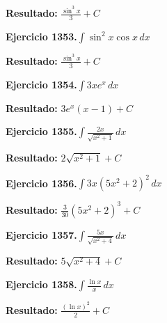 \documentclass[10pt,a4paper]{article}
\begin{document}
\begin{solbox}
\textbf{Resultado:} \(\displaystyle \frac{\sin^{3}x}{3} + C\)
\end{solbox}

\begin{ejbox}
\textbf{Ejercicio 1353.}\quad $\int \sin^{2}x \cos x\,dx$
\end{ejbox}

\begin{solbox}
\textbf{Resultado:} \(\displaystyle \frac{\sin^{3}x}{3} + C\)
\end{solbox}

\newpage
\begin{ejbox}
\textbf{Ejercicio 1354.}\quad $\int 3x e^{x}\,dx$
\end{ejbox}

\begin{solbox}
\textbf{Resultado:} \(\displaystyle 3e^x(x-1) + C\)
\end{solbox}

\begin{ejbox}
\textbf{Ejercicio 1355.}\quad $\int \frac{2x}{\sqrt{x^2+1}}\,dx$
\end{ejbox}

\begin{solbox}
\textbf{Resultado:} \(\displaystyle 2\sqrt{x^2+1} + C\)
\end{solbox}

\begin{ejbox}
\textbf{Ejercicio 1356.}\quad $\int 3x(5x^2 + 2)^{2}\,dx$
\end{ejbox}

\begin{solbox}
\textbf{Resultado:} \(\displaystyle \frac{3}{30}(5x^2+2)^{3} + C\)
\end{solbox}

\newpage
\begin{ejbox}
\textbf{Ejercicio 1357.}\quad $\int \frac{5x}{\sqrt{x^2+4}}\,dx$
\end{ejbox}

\begin{solbox}
\textbf{Resultado:} \(\displaystyle 5\sqrt{x^2+4} + C\)
\end{solbox}

\begin{ejbox}
\textbf{Ejercicio 1358.}\quad $\int \frac{\ln x}{x}\,dx$
\end{ejbox}

\begin{solbox}
\textbf{Resultado:} \(\displaystyle \frac{(\ln x)^2}{2} + C\)
\end{solbox}
\end{document}
